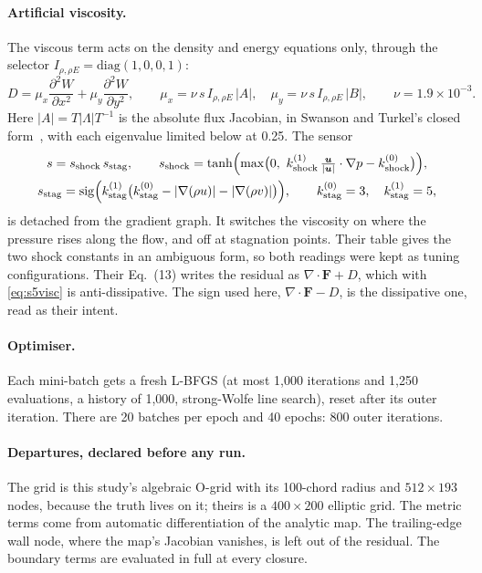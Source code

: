 \documentclass[11pt]{article}
\newcommand{\vu}{\bm{u}}
\begin{document}
\paragraph{Artificial viscosity.}
The viscous term acts on the density and energy equations only, through the selector
$I_{\rho,\rho E} = \mathrm{diag}(1,0,0,1)$:
\begin{equation}
  D = \mu_x\frac{\partial^2 W}{\partial x^2} + \mu_y\frac{\partial^2 W}{\partial y^2},\qquad
  \mu_x = \nu\,s\,I_{\rho,\rho E}\,|A|,\quad \mu_y = \nu\,s\,I_{\rho,\rho E}\,|B|,\qquad \nu = 1.9\times10^{-3}.
  \label{eq:s5visc}
\end{equation}
Here $|A| = T|\Lambda|T^{-1}$ is the absolute flux Jacobian, in Swanson and Turkel's closed
form~\cite{swanson1992}, with each eigenvalue limited below at 0.25. The sensor
\begin{equation}
  \begin{gathered}
  s = s_{\mathrm{shock}}\,s_{\mathrm{stag}},\qquad
  s_{\mathrm{shock}} = \tanh\Bigl(\max\bigl(0,\ k^{(1)}_{\mathrm{shock}}\,\tfrac{\vu}{|\vu|}\cdot\nabla p - k^{(0)}_{\mathrm{shock}}\bigr)\Bigr),\\
  s_{\mathrm{stag}} = \mathrm{sig}\Bigl(k^{(1)}_{\mathrm{stag}}\bigl(k^{(0)}_{\mathrm{stag}} - |\nabla(\rho u)| - |\nabla(\rho v)|\bigr)\Bigr),\qquad
  k^{(0)}_{\mathrm{stag}} = 3,\quad k^{(1)}_{\mathrm{stag}} = 5,
  \end{gathered}
  \label{eq:s5sensor}
\end{equation}
is detached from the gradient graph. It switches the viscosity on where the pressure rises along
the flow, and off at stagnation points. Their table gives the two shock constants in an ambiguous
form, so both readings were kept as tuning configurations. Their Eq.~(13) writes the residual as
$\nabla\!\cdot\!\bm F + D$, which with \cref{eq:s5visc} is anti-dissipative. The sign used here,
$\nabla\!\cdot\!\bm F - D$, is the dissipative one, read as their intent.

\paragraph{Optimiser.}
Each mini-batch gets a fresh L-BFGS (at most 1,000 iterations and 1,250 evaluations, a history of
1,000, strong-Wolfe line search), reset after its outer iteration. There are 20 batches per epoch
and 40 epochs: 800 outer iterations.

\paragraph{Departures, declared before any run.}
The grid is this study's algebraic O-grid with its 100-chord radius and $512\times193$ nodes,
because the truth lives on it; theirs is a $400\times200$ elliptic grid. The metric terms come
from automatic differentiation of the analytic map. The trailing-edge wall node, where the map's
Jacobian vanishes, is left out of the residual. The boundary terms are evaluated in full at every
closure.
\end{document}

